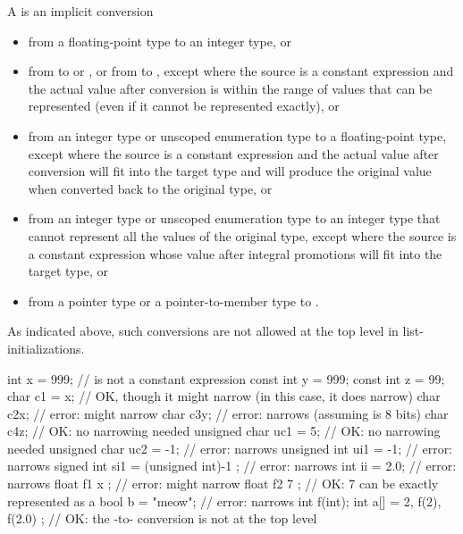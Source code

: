 \pnum
A
%
%
 is an implicit conversion
\begin{itemize}
\item from a floating-point type to an integer type, or

\item from  to  or , or from
 to , except where the source is a constant expression and
the actual value after conversion
is within the range of values that can be represented (even if it cannot be represented exactly),
or

\item from an integer type or unscoped enumeration type to a floating-point type, except
where the source is a constant expression and the actual value after conversion will fit
into the target type and will produce the original value when converted back to the
original type, or

\item from an integer type or unscoped enumeration type to an integer type that cannot
represent all the values of the original type, except where the source is a constant
expression whose value after integral promotions will fit into the target type, or

\item from a pointer type or a pointer-to-member type to .
\end{itemize}

\begin{note}
As indicated above, such conversions are not allowed at the top level in
list-initializations.
\end{note}
\begin{example}
\begin{codeblock}
int x = 999;                    //  is not a constant expression
const int y = 999;
const int z = 99;
char c1 = x;                    // OK, though it might narrow (in this case, it does narrow)
char c2{x};                     // error: might narrow
char c3{y};                     // error: narrows (assuming  is 8 bits)
char c4{z};                     // OK: no narrowing needed
unsigned char uc1 = {5};        // OK: no narrowing needed
unsigned char uc2 = {-1};       // error: narrows
unsigned int ui1 = {-1};        // error: narrows
signed int si1 =
  { (unsigned int)-1 };         // error: narrows
int ii = {2.0};                 // error: narrows
float f1 { x };                 // error: might narrow
float f2 { 7 };                 // OK: 7 can be exactly represented as a 
bool b = {"meow"};              // error: narrows
int f(int);
int a[] = { 2, f(2), f(2.0) };  // OK: the -to- conversion is not at the top level
\end{codeblock}
\end{example}
%
%


